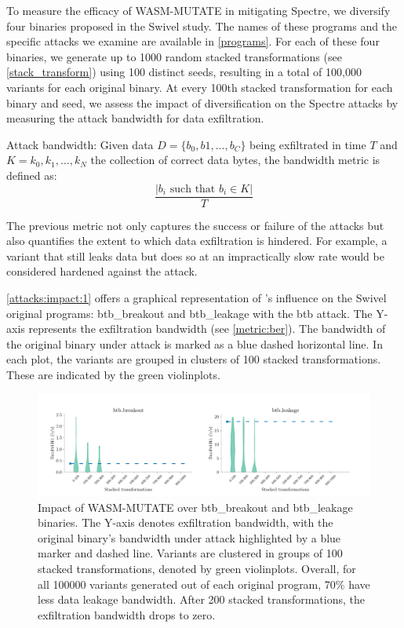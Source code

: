 To measure the efficacy of WASM-MUTATE in mitigating Spectre, we diversify four \Wasm binaries proposed in the Swivel study. 
The names of these programs and the specific attacks we examine are available in \autoref{programs}. 
For each of these four binaries, we generate up to 1000 random stacked transformations (see \autoref{stack_transform}) using 100 distinct seeds, resulting in a total of 100,000 variants for each original binary. 
At every 100th stacked transformation for each binary and seed, we assess the impact of diversification on the Spectre attacks by measuring the attack bandwidth for data exfiltration. 

\begin{definition}{Attack bandwidth:}\label{metric:ber}
    Given data $D=\{b_0, b1, ..., b_C\}$ being exfiltrated in time $T$ and $K = {k_0, k_1, ..., k_N}$ the collection of correct data bytes, the bandwidth metric is defined as:
    $$
        \frac{|b_i\text{ such that } b_i \in K|}{T}
    $$
\end{definition}

The previous metric not only captures the success or failure of the attacks but also quantifies the extent to which data exfiltration is hindered. 
For example, a variant that still leaks data but does so at an impractically slow rate would be considered hardened against the attack.



\autoref{attacks:impact:1} offers a graphical representation of \tool's influence on the Swivel original programs: btb\_breakout and btb\_leakage with the btb attack. 
The Y-axis represents the exfiltration bandwidth (see \autoref{metric:ber}). 
The bandwidth of the original binary under attack is marked as a blue dashed horizontal line.
In each plot, the variants are grouped in clusters of 100 stacked transformations. 
These are indicated by the green violinplots.

\begin{figure}[h]
    \centering
    \includegraphics[width=\linewidth]{plots/spectre/results.rq3.1.pdf}
    \caption{Impact of WASM-MUTATE over btb\_breakout and btb\_leakage binaries. The Y-axis denotes exfiltration bandwidth, with the original binary's bandwidth under attack highlighted by a blue marker and dashed line. Variants are clustered in groups of 100 stacked transformations, denoted by green violinplots. 
    Overall, for all 100000 variants generated out of each original program, 70\% have less data leakage bandwidth.
    After 200 stacked transformations, the exfiltration bandwidth drops to zero.
    }
  \label{attacks:impact:1}
\end{figure}

